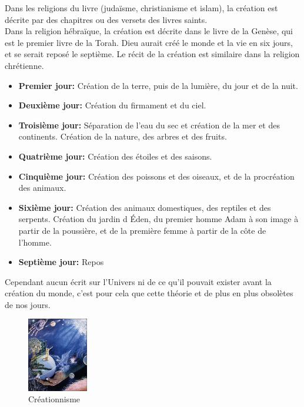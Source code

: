 Dans les religions du livre (judaïsme, christianisme et islam), 
 la création est décrite par des chapitres ou des versets des livres saints. \\
Dans la religion hébraïque, la création est décrite dans le livre de la Genèse, 
 qui est le premier livre de la Torah. Dieu aurait créé le monde et la vie en 
 six jours, et se serait reposé le septième. Le récit de la création est 
 similaire dans la religion chrétienne.

\begin{itemize}
\item \textbf{Premier jour:} Création de la terre, puis de la lumière, du jour 
	et de la nuit. \\
\item \textbf{Deuxième jour:} Création du firmament et du ciel. \\
\item \textbf{Troisième jour:} Séparation de l'eau du sec et création de la mer 
	et des continents. Création de la nature, des arbres et des fruits. \\
\item \textbf{Quatrième jour:} Création des étoiles et des saisons. \\
\item \textbf{Cinquième jour:} Création des poissons et des oiseaux, et de la 
	procréation des animaux. \\
\item \textbf{Sixième jour:} Création des animaux domestiques, des reptiles et 
	des serpents. Création du jardin d Éden, du premier homme Adam à son image
	à partir de la poussière, et de la première femme à partir de la côte de 
	l'homme. \\
\item \textbf{Septième jour:} Repos \\
\end{itemize}

Cependant aucun écrit sur l'Univers ni de ce qu'il pouvait exister avant la 
création du monde, c'est pour cela que cette théorie et de plus en plus 
obsolètes de nos jours.

	\begin{figure}[h]
		\begin{center}
	\includegraphics[width=100px]{img5.png}
	\caption{Créationnisme}
		\end{center}
	\end{figure}
	
